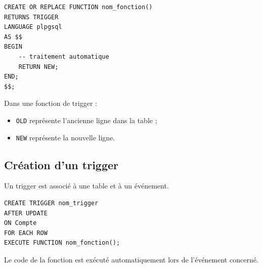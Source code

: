 \documentclass[11pt]{article}
\begin{document}
\begin{verbatim}
CREATE OR REPLACE FUNCTION nom_fonction()
RETURNS TRIGGER
LANGUAGE plpgsql
AS $$
BEGIN
    -- traitement automatique
    RETURN NEW;
END;
$$;
\end{verbatim}

Dans une fonction de trigger :
\begin{itemize}
    \item \texttt{OLD} représente l’ancienne ligne dans la table ;
    \item \texttt{NEW} représente la nouvelle ligne.
\end{itemize}

\bigskip

\subsection*{Création d’un trigger}

Un trigger est associé à une table et à un événement.

\begin{verbatim}
CREATE TRIGGER nom_trigger
AFTER UPDATE
ON Compte
FOR EACH ROW
EXECUTE FUNCTION nom_fonction();
\end{verbatim}

Le code de la fonction est exécuté automatiquement
lors de l’événement concerné.
\end{document}
